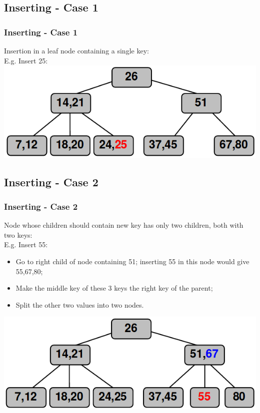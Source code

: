 \documentclass{beamer}
\begin{document}
\subsection{Inserting - Case 1}
\begin{frame}
\frametitle{Inserting - Case 1}
Insertion in a leaf node containing a single key:\\
E.g. Insert 25:\\
\includegraphics[scale=0.5]{single.png}
\end{frame}
\subsection{Inserting - Case 2}
\begin{frame}
\frametitle{Inserting - Case 2}
Node whose children should contain new key has only two children, both with two keys:\\
E.g. Insert 55:\\
\begin{itemize}
\item Go to right child of node containing 51; inserting 55 in this node would give {\color{red}55},{\color{blue}67},80;
\item Make the middle key of these 3 keys the right key of the parent;
\item Split the other two values into two nodes.
\end{itemize}
\includegraphics[scale=0.3]{case2.png}
\end{frame}
\end{document}
